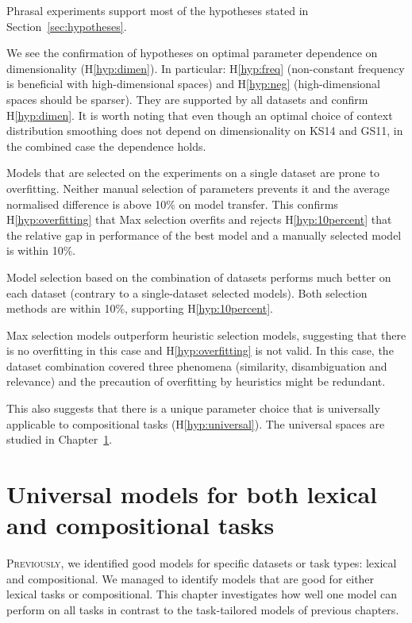 Phrasal experiments support most of the hypotheses stated in
Section~\ref{sec:hypotheses}.

We see the confirmation of hypotheses on optimal parameter dependence on dimensionality (H\ref{hyp:dimen}). In particular: H\ref{hyp:freq} (non-constant frequency is beneficial with high-dimensional spaces) and H\ref{hyp:neg} (high-dimensional spaces should be sparser). They are supported by all datasets and confirm H\ref{hyp:dimen}. It is worth noting that even though an optimal choice of context distribution smoothing does not depend on dimensionality on KS14 and GS11, in the combined case the dependence holds.

Models that are selected on the experiments on a single dataset are prone to overfitting. Neither manual selection of parameters prevents it and the average normalised difference is above 10\% on model transfer. This confirms H\ref{hyp:overfitting} that Max selection overfits and rejects H\ref{hyp:10percent} that the relative gap in performance of the best model and a manually selected model is within 10\%.

Model selection based on the combination of datasets performs much better on each dataset (contrary to a single-dataset selected models). Both selection methods are within 10\%, supporting H\ref{hyp:10percent}.

Max selection models outperform heuristic selection models, suggesting that there is no overfitting in this case and H\ref{hyp:overfitting} is not valid. In this case, the dataset combination covered three phenomena (similarity, disambiguation and relevance) and the precaution of overfitting by heuristics might be redundant.

This also suggests that there is a unique parameter choice that is universally applicable to compositional tasks (H\ref{hyp:universal}). The universal spaces are studied in Chapter~\ref{sec:universal-param-selection}.

\chapter[Universal models]{Universal models for both lexical and compositional tasks}
\label{sec:universal-param-selection}

\lettrine[lines=5,loversize=0.25]{P}{reviously}, we identified good models for specific datasets or task types: lexical and compositional. We managed to identify models that are good for either lexical tasks or compositional. This chapter investigates how well one model can perform on all tasks in contrast to the task-tailored models of previous chapters.

